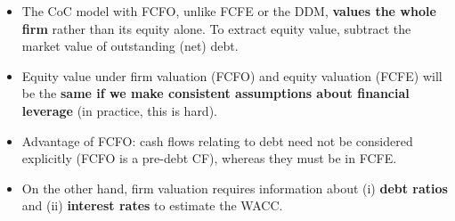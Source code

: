 \begin{itemize}
  \item The CoC model with FCFO, unlike FCFE or the DDM, \textbf{values the whole firm} rather than its equity alone. To extract equity value, subtract the market value of outstanding (net) debt.
  \item Equity value under firm valuation (FCFO) and equity valuation (FCFE) will be the \textbf{same if we make consistent assumptions about financial leverage} (in practice, this is hard).
  \item Advantage of FCFO: cash flows relating to debt need not be considered explicitly (FCFO is a pre-debt CF), whereas they must be in FCFE.
  \item On the other hand, firm valuation requires information about (i) \textbf{debt ratios} and (ii) \textbf{interest rates} to estimate the WACC.
\end{itemize}

